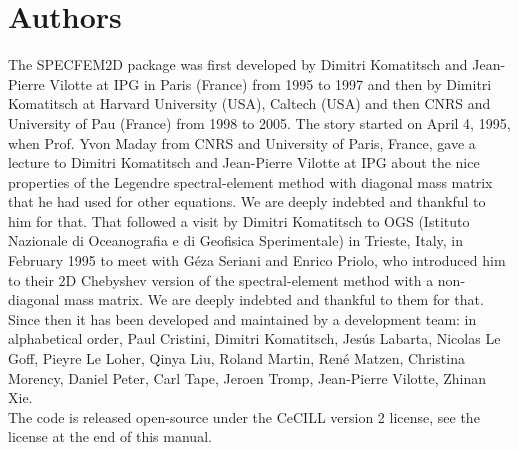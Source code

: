 \documentclass[oneside,english,onecolumn,letterpaper]{book}
\begin{document}
\section*{Authors}
The SPECFEM2D package was first developed by Dimitri Komatitsch and Jean-Pierre Vilotte at IPG in Paris (France) from 1995 to 1997
and then by Dimitri Komatitsch at Harvard University (USA), Caltech (USA) and then CNRS and University of Pau (France) from 1998 to 2005.
The story started on April 4, 1995, when Prof. Yvon Maday from CNRS and University of Paris, France, gave a lecture to
Dimitri Komatitsch and Jean-Pierre Vilotte at IPG about the nice properties of the Legendre spectral-element method with diagonal mass matrix that he had used for
other equations. We are deeply indebted and thankful to him for that.
That followed a visit by Dimitri Komatitsch to OGS (Istituto Nazionale di Oceanografia e di Geofisica Sperimentale) in Trieste, Italy, in February 1995
to meet with G\'eza Seriani and Enrico Priolo, who introduced him to their 2D Chebyshev version of the spectral-element method with a non-diagonal mass matrix.
We are deeply indebted and thankful to them for that.\\

Since then it has been developed and maintained by a development team: in alphabetical order,
Paul Cristini,
Dimitri Komatitsch,
Jes\'us Labarta,
Nicolas Le Goff,
Pieyre Le Loher,
Qinya Liu,
Roland Martin,
Ren\'e Matzen,
Christina Morency,
Daniel Peter,
Carl Tape,
Jeroen Tromp,
Jean-Pierre Vilotte,
Zhinan Xie.\\

The code is released open-source under the CeCILL version 2 license, see the license at the end of this manual.\\

\newpage{}
\end{document}

